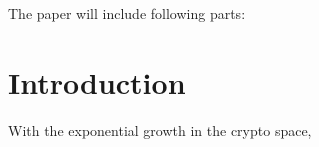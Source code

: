 
The paper will include following parts:
\section{Introduction}

With the exponential growth in the crypto space,

%
%
%
